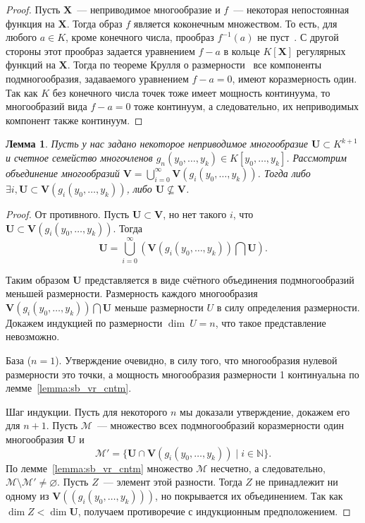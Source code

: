 \documentclass[16pt]{article}
\theoremstyle{plain1}
\newtheorem{lemma}[theorem1]{Лемма}
\theoremstyle{plain2}
\theoremstyle{plain}
\theoremstyle{plain3}
\theoremstyle{definition}
\theoremstyle{remark}
\begin{document}
\begin{proof}
Пусть $\mathbf{X}$~--- неприводимое многообразие и $f$~--- некоторая
непостоянная функция на $\mathbf{X}$. Тогда образ $f$ является
коконечным множеством. То есть, для любого $a\in K$, кроме конечного
числа, прообраз $f^{-1}(a)$ не пуст~\cite[Глава 2, параграф 3, упр 3.19]{Hartshorn}. С другой стороны
этот прообраз задается уравнением $f-a$ в кольце $K[\mathbf{X}]$
регулярных функций на $\mathbf{X}$. Тогда по теореме Крулля о размерности~\cite[Chapter~5,
Section~12, Theorem~18]{Matsumura} все
компоненты подмногообразия, задаваемого уравнением $f-a=0$, имеют
коразмерность один. Так как $K$ без конечного числа точек тоже
имеет мощность континуума, то многообразий вида $f-a=0$ тоже континуум, а следовательно, их
неприводимых компонент также континуум.
\end{proof}

\begin{lemma} \label{lemma:o vlojenii}
Пусть у нас задано некоторое неприводимое многообразие
$\mathbf{U}\subset K^{k+1}$ и счетное семейство многочленов
$g_n(y_0,\ldots, y_k)\in K[y_0,\ldots, y_k ]$. Рассмотрим объединение
многообразий $\mathbf{V}=\bigcup\limits
_{i=0}^{\infty}\mathbf{V}(g_i(y_0,\ldots, y_k))$. Тогда либо
$\exists i, \mathbf{U} \subset \mathbf{V}(g_i(y_0,\ldots, y_k))$, либо
$\mathbf{U}\nsubseteq \mathbf{V}$.
\end{lemma}

\begin{proof}
От противного. Пусть $\mathbf{U}\subset \mathbf{V}$, но нет такого
$i$, что $\mathbf{U} \subset \mathbf{V}(g_i(y_0,\ldots, y_k))$.
Тогда
$$
\mathbf{U}=\bigcup\limits_{i=0}^{\infty}(\mathbf{V}(g_i(y_0,\ldots,
y_k))\bigcap \mathbf{U}).
$$

Таким образом $\mathbf{U}$ представляется в виде счётного объединения
подмногообразий меньшей размерности. Размерность каждого многообразия
$\mathbf{V}(g_i(y_0,\ldots, y_k))\bigcap \mathbf{U}$ меньше
размерности $U$ в силу определения размерности. Докажем индукцией
по размерности $\dim~U=n$,
что такое представление невозможно.

База ($n=1$). Утверждение очевидно, в силу того, что многообразия
нулевой размерности это точки, а мощность многообразия
размерности 1 континуальна по лемме~\ref{lemma:sb_vr_cntm}.

Шаг индукции. Пусть для некоторого $n$ мы доказали утверждение, докажем его для $n+1$.
Пусть $\mathcal M$~--- множество всех подмногообразий коразмерности
один многообразия $\mathbf{U}$ и
$$
\mathcal M' = \{ \mathbf{U}\cap \mathbf{V}(g_i(y_0,\ldots,y_k))\mid
i\in \mathbb N \}.
$$
По лемме~\ref{lemma:sb_vr_cntm} множество $\mathcal M$ несчетно, а
следовательно, $\mathcal M\setminus\mathcal M'\neq \varnothing$.
Пусть $Z$~--- элемент этой разности. Тогда $Z$ не принадлежит ни
одному из $\mathbf{V}((g_i(y_0,\ldots,y_k)))$, но покрывается их
объединением. Так как $\dim Z<\dim \mathbf{U}$, получаем
противоречие с индукционным предположением.
\end{proof}
\end{document}

